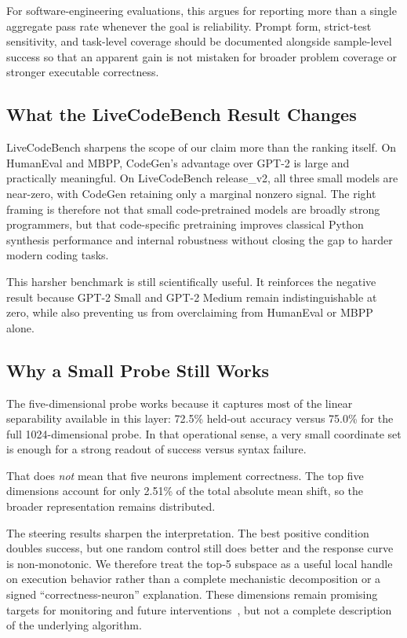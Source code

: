 \documentclass[preprint,12pt,authoryear]{elsarticle}
\begin{document}
For software-engineering evaluations, this argues for reporting more than a single aggregate pass rate whenever the goal is reliability. Prompt form, strict-test sensitivity, and task-level coverage should be documented alongside sample-level success so that an apparent gain is not mistaken for broader problem coverage or stronger executable correctness.

\subsection{What the LiveCodeBench Result Changes}

LiveCodeBench sharpens the scope of our claim more than the ranking itself. On HumanEval and MBPP, CodeGen's advantage over GPT-2 is large and practically meaningful. On LiveCodeBench release\_v2, all three small models are near-zero, with CodeGen retaining only a marginal nonzero signal. The right framing is therefore not that small code-pretrained models are broadly strong programmers, but that code-specific pretraining improves classical Python synthesis performance and internal robustness without closing the gap to harder modern coding tasks.

This harsher benchmark is still scientifically useful. It reinforces the negative result because GPT-2 Small and GPT-2 Medium remain indistinguishable at zero, while also preventing us from overclaiming from HumanEval or MBPP alone.

\subsection{Why a Small Probe Still Works}

The five-dimensional probe works because it captures most of the linear separability available in this layer: 72.5\% held-out accuracy versus 75.0\% for the full 1024-dimensional probe. In that operational sense, a very small coordinate set is enough for a strong readout of success versus syntax failure.

That does \emph{not} mean that five neurons implement correctness. The top five dimensions account for only 2.51\% of the total absolute mean shift, so the broader representation remains distributed.

The steering results sharpen the interpretation. The best positive condition doubles success, but one random control still does better and the response curve is non-monotonic. We therefore treat the top-5 subspace as a useful local handle on execution behavior rather than a complete mechanistic decomposition or a signed ``correctness-neuron'' explanation. These dimensions remain promising targets for monitoring and future interventions~\cite{meng2022locating}, but not a complete description of the underlying algorithm.
\end{document}
